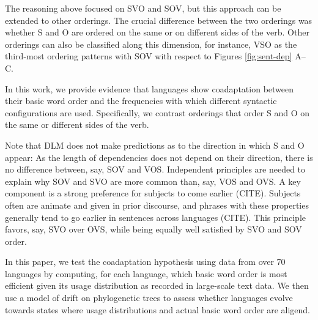 \documentclass[11pt,a4paper]{article}
\newcommand\comment[1]{{\color{red}#1}}
\begin{document}
The reasoning above focused on SVO and SOV, but this approach can be extended to other orderings.
The crucial difference between the two orderings was whether S and O are ordered on the same or on different sides of the verb.
Other orderings can also be classified along this dimension, for instance, VSO as the third-most ordering patterns with SOV with respect to Figures \ref{fig:sent-dep} A--C.

In this work, we provide evidence that languages show coadaptation between their basic word order and the frequencies with which different syntactic configurations are used.
Specifically, we contrast orderings that order S and O on the same or different sides of the verb.

Note that DLM does not make predictions as to the direction in which S and O appear: As the length of dependencies does not depend on their direction, there is no difference between, say, SOV and VOS.
Independent principles are needed to explain why SOV and SVO are more common than, say, VOS and OVS.
A key component is a strong preference for subjects to come earlier (CITE).
Subjects often are animate and given in prior discourse, and phrases with these properties generally tend to go earlier in sentences across languages (CITE).
This principle favors, say, SVO over OVS, while being equally well satisfied by SVO and SOV order.




In this paper, we test the coadaptation hypothesis using data from over 70 languages by computing, for each language, which basic word order is most efficient given its usage distribution as recorded in large-scale text data.
We then use a model of drift on phylogenetic trees to assess whether languages evolve towards states where usage distributions and actual basic word order are aligend.



\end{document}
